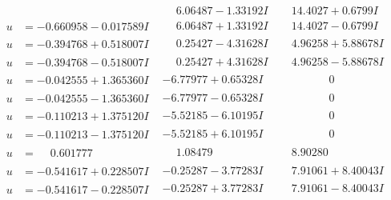 \documentclass[1p]{elsarticle_modified}
\theoremstyle{definition}
\begin{document}
$$\begin{array}{c|c|c}
 & \phantom{-}6.06487 - 1.33192 I & \phantom{-}14.4027 + 0.6799 I \\ \hline\begin{aligned}
u &= -0.660958 - 0.017589 I\end{aligned}
 & \phantom{-}6.06487 + 1.33192 I & \phantom{-}14.4027 - 0.6799 I \\ \hline\begin{aligned}
u &= -0.394768 + 0.518007 I\end{aligned}
 & \phantom{-}0.25427 - 4.31628 I & \phantom{-}4.96258 + 5.88678 I \\ \hline\begin{aligned}
u &= -0.394768 - 0.518007 I\end{aligned}
 & \phantom{-}0.25427 + 4.31628 I & \phantom{-}4.96258 - 5.88678 I \\ \hline\begin{aligned}
u &= -0.042555 + 1.365360 I\end{aligned}
 & -6.77977 + 0.65328 I & \phantom{-0.000000 } 0 \\ \hline\begin{aligned}
u &= -0.042555 - 1.365360 I\end{aligned}
 & -6.77977 - 0.65328 I & \phantom{-0.000000 } 0 \\ \hline\begin{aligned}
u &= -0.110213 + 1.375120 I\end{aligned}
 & -5.52185 - 6.10195 I & \phantom{-0.000000 } 0 \\ \hline\begin{aligned}
u &= -0.110213 - 1.375120 I\end{aligned}
 & -5.52185 + 6.10195 I & \phantom{-0.000000 } 0 \\ \hline\begin{aligned}
u &= \phantom{-}0.601777\phantom{ +0.000000I}\end{aligned}
 & \phantom{-}1.08479\phantom{ +0.000000I} & \phantom{-}8.90280\phantom{ +0.000000I} \\ \hline\begin{aligned}
u &= -0.541617 + 0.228507 I\end{aligned}
 & -0.25287 - 3.77283 I & \phantom{-}7.91061 + 8.40043 I \\ \hline\begin{aligned}
u &= -0.541617 - 0.228507 I\end{aligned}
 & -0.25287 + 3.77283 I & \phantom{-}7.91061 - 8.40043 I \\ \hline\begin{aligned}

\end{aligned}
\end{array}$$
\end{document}
